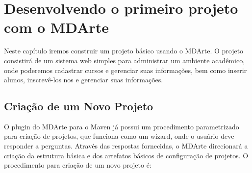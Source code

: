 \chapter{Desenvolvendo o primeiro projeto com o MDArte}

Neste capítulo iremos construir um projeto básico usando o MDArte. O projeto
consistirá de um sistema web simples para administrar um ambiente acadêmico,
onde poderemos cadastrar cursos e gerenciar suas informações, bem como inserir
alunos, inscrevê-los nos e gerenciar suas informações.

\section{Criação de um Novo Projeto}

O plugin do MDArte para o Maven já possui um procedimento parametrizado para
criação de projetos, que funciona como um wizard, onde o usuário deve responder
a perguntas. Através das respostas fornecidas, o MDArte direcionará a criação da
estrutura básica e dos artefatos básicos de configuração de projetos. O
procedimento para criação de um novo projeto é:

